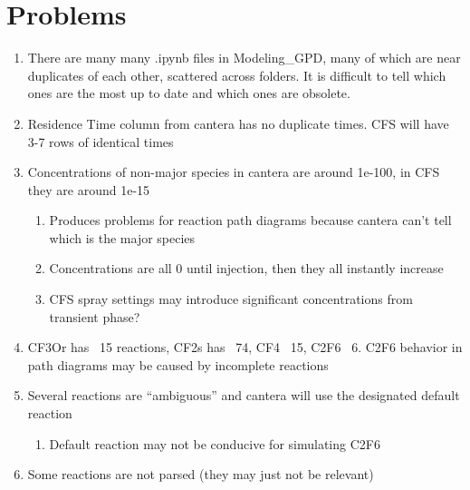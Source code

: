 \documentclass{article}
\begin{document}
\section*{Problems}
\begin{enumerate}
    \item There are many many .ipynb files in Modeling\_GPD, many of which are near duplicates of each other, scattered across folders. It is difficult to tell which ones are the most up to date and which ones are obsolete.
    \item Residence Time column from cantera has no duplicate times. CFS will have 3-7 rows of identical times
    \item Concentrations of non-major species in cantera are around 1e-100, in CFS they are around 1e-15
    \begin{enumerate}
        \item Produces problems for reaction path diagrams because cantera can’t tell which is the major species
        \item Concentrations are all 0 until injection, then they all instantly increase
        \item CFS spray settings may introduce significant concentrations from transient phase?
    \end{enumerate}
    \item CF3Or has ~15 reactions, CF2s has ~74, CF4 ~15, C2F6 ~6. C2F6 behavior in path diagrams may be caused by incomplete reactions
    \item Several reactions are “ambiguous” and cantera will use the designated default reaction
    \begin{enumerate}
        \item Default reaction may not be conducive for simulating C2F6
    \end{enumerate}
    \item Some reactions are not parsed (they may just not be relevant)
\end{enumerate}
\end{document}
